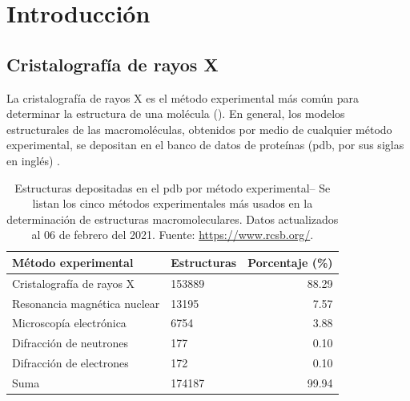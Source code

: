 \chapter{Introducción}
\section{Cristalografía de rayos X}
La cristalografía de rayos X es el método experimental más común para determinar la estructura de una molécula (). En general, los modelos estructurales de las macromoléculas, obtenidos por medio de cualquier método experimental, se depositan en el banco de datos de proteínas (\acrshort{pdb}, por sus siglas en inglés) . %

\begin{table}[h]
	\centering
	\begin{tabular}{@{}llr@{}}
		\toprule
		Método experimental & Estructuras  & Porcentaje (\si{\percent})       \\ 
		\midrule
		Cristalografía de rayos X        & 153889 & 88.29 \\
		Resonancia magnética nuclear & 13195  & 7.57  \\
		Microscopía electrónica      & 6754   & 3.88  \\
		Difracción de neutrones	     & 177    & 0.10  \\
		Difracción de electrones     & 172    & 0.10  \\
		\midrule
		Suma                         & 174187 & 99.94 \\ \bottomrule
	\end{tabular}%
	\caption[Estructuras por método experimental]{Estructuras depositadas en el \acrshort{pdb} por método experimental-- Se listan los cinco métodos experimentales más usados en la determinación de estructuras macromoleculares. Datos actualizados al 06 de febrero del 2021. Fuente: \url{https://www.rcsb.org/}.}
\end{table}

